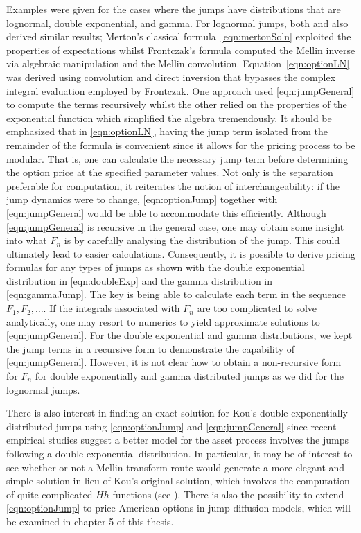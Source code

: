 Examples were given for the cases where the jumps have distributions that are lognormal, double exponential, and gamma. For lognormal jumps, both \cite{Merton1976} and \cite{Frontczak2013} also derived similar results; Merton's classical formula~\eqref{eqn:mertonSoln} exploited the properties of expectations whilst Frontczak's formula computed the Mellin inverse via algebraic manipulation and the Mellin convolution. Equation~\eqref{eqn:optionLN} was derived using convolution and direct inversion that bypasses the complex integral evaluation employed by Frontczak. One approach used \eqref{eqn:jumpGeneral} to compute the terms recursively whilst the other relied on the properties of the exponential function which simplified the algebra tremendously. It should be emphasized that in \eqref{eqn:optionLN}, having the jump term isolated from the remainder of the formula is convenient since it allows for the pricing process to be modular. That is, one can calculate the necessary jump term before determining the option price at the specified parameter values. Not only is the separation preferable for computation, it reiterates the notion of interchangeability: if the jump dynamics were to change, \eqref{eqn:optionJump} together with \eqref{eqn:jumpGeneral} would be able to accommodate this efficiently. %
Although \eqref{eqn:jumpGeneral} is recursive in the general case, one may obtain some insight into what $F_n$ is by carefully analysing the distribution of the jump. This could ultimately lead to easier calculations. Consequently, it is possible to derive pricing formulas for any types of jumps as shown with the double exponential distribution in \eqref{eqn:doubleExp} and the gamma distribution in \eqref{eqn:gammaJump}. The key is being able to calculate each term in the sequence $F_1, F_2, \ldots$. If the integrals associated with $F_n$ are too complicated to solve analytically, one may resort to numerics to yield approximate solutions to \eqref{eqn:jumpGeneral}. For the double exponential and gamma distributions, we kept the jump terms in a recursive form to demonstrate the capability of \eqref{eqn:jumpGeneral}. However, it is not clear how to obtain a non-recursive form for $F_n$ for double exponentially and gamma distributed jumps as we did for the lognormal jumps.

There is also interest in finding an exact solution for Kou's double exponentially distributed jumps \cite{Kou2002, Kou2004} using \eqref{eqn:optionJump} and \eqref{eqn:jumpGeneral} since recent empirical studies suggest a better model for the asset process involves the jumps following a double exponential distribution. In particular, it may be of interest to see whether or not a Mellin transform route would generate a more elegant and simple solution in lieu of Kou's original solution, which involves the computation of quite complicated $Hh$ functions (see \cite[pp. 691]{Abramowitz1972}). There is also the possibility to extend \eqref{eqn:optionJump} to price American options in jump-diffusion models, which will be examined in chapter 5 of this thesis.
	
